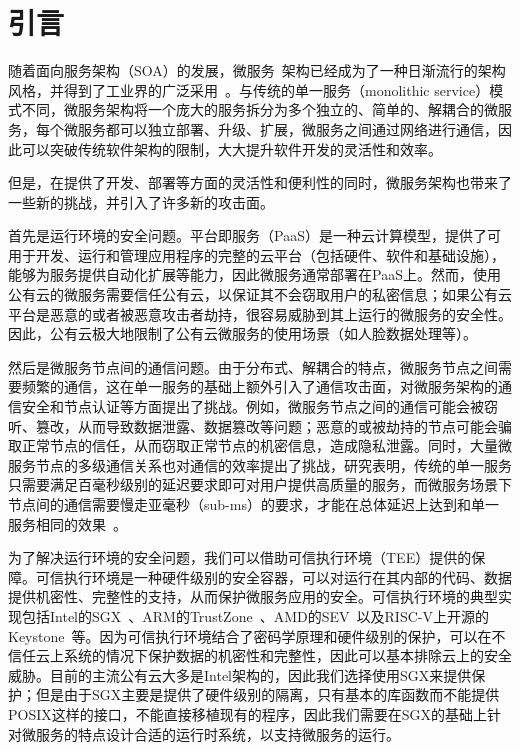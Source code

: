 \section{引言}\label{sec:introduction}
随着面向服务架构（SOA）的发展，微服务~\cite{}架构已经成为了一种日渐流行的架构风格，并得到了工业界的广泛采用~\cite{}。与传统的单一服务（monolithic service）模式不同，微服务架构将一个庞大的服务拆分为多个独立的、简单的、解耦合的微服务，每个微服务都可以独立部署、升级、扩展，微服务之间通过网络进行通信，因此可以突破传统软件架构的限制，大大提升软件开发的灵活性和效率。


但是，在提供了开发、部署等方面的灵活性和便利性的同时，微服务架构也带来了一些新的挑战，并引入了许多新的攻击面。

首先是运行环境的安全问题。平台即服务（PaaS）是一种云计算模型，提供了可用于开发、运行和管理应用程序的完整的云平台（包括硬件、软件和基础设施），能够为服务提供自动化扩展等能力，因此微服务通常部署在PaaS上。然而，使用公有云的微服务需要信任公有云，以保证其不会窃取用户的私密信息；如果公有云平台是恶意的或者被恶意攻击者劫持，很容易威胁到其上运行的微服务的安全性。因此，公有云极大地限制了公有云微服务的使用场景（如人脸数据处理等）。

然后是微服务节点间的通信问题。由于分布式、解耦合的特点，微服务节点之间需要频繁的通信，这在单一服务的基础上额外引入了通信攻击面，对微服务架构的通信安全和节点认证等方面提出了挑战。例如，微服务节点之间的通信可能会被窃听、篡改，从而导致数据泄露、数据篡改等问题；恶意的或被劫持的节点可能会骗取正常节点的信任，从而窃取正常节点的机密信息，造成隐私泄露。同时，大量微服务节点的多级通信关系也对通信的效率提出了挑战，研究表明，传统的单一服务只需要满足百毫秒级别的延迟要求即可对用户提供高质量的服务，而微服务场景下节点间的通信需要慢走亚毫秒（sub-ms）的要求，才能在总体延迟上达到和单一服务相同的效果~\cite{}。

为了解决运行环境的安全问题，我们可以借助可信执行环境（TEE）提供的保障。可信执行环境是一种硬件级别的安全容器，可以对运行在其内部的代码、数据提供机密性、完整性的支持，从而保护微服务应用的安全。可信执行环境的典型实现包括Intel的SGX~\cite{}、ARM的TrustZone~\cite{}、AMD的SEV~\cite{}以及RISC-V上开源的Keystone~\cite{}等。因为可信执行环境结合了密码学原理和硬件级别的保护，可以在不信任云上系统的情况下保护数据的机密性和完整性，因此可以基本排除云上的安全威胁。目前的主流公有云大多是Intel架构的，因此我们选择使用SGX来提供保护；但是由于SGX主要是提供了硬件级别的隔离，只有基本的库函数而不能提供POSIX这样的接口，不能直接移植现有的程序，因此我们需要在SGX的基础上针对微服务的特点设计合适的运行时系统，以支持微服务的运行。

